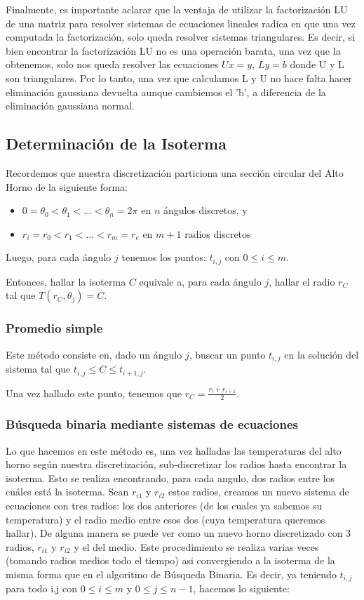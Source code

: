 Finalmente, es importante aclarar que la ventaja de utilizar la factorización LU de una matriz para resolver sistemas de ecuaciones lineales radica en que una vez computada la factorización, solo queda resolver sistemas triangulares. Es decir, si bien encontrar la factorización LU no es una operación barata, una vez que la obtenemos, solo nos queda resolver las ecuaciones $Ux = y$, $Ly = b$ donde U y L son triangulares. Por lo tanto, una vez que calculamos L y U no hace falta hacer eliminación gaussiana devuelta aunque cambiemos el 'b', a diferencia de la eliminación gaussiana normal.

\subsection{Determinación de la Isoterma}

Recordemos que nuestra discretización particiona una sección circular del Alto Horno de la siguiente forma:
 \begin{itemize}
 	\item $0 = \theta_0 < \theta_1 < ... < \theta_n = 2\pi$ en $n$ \'angulos discretos, y
 	\item $r_i = r_0 < r_1 < ... < r_m = r_e$ en $m+1$ radios discretos
 \end{itemize}

Luego, para cada ángulo $j$ tenemos los puntos: $t_{i,j}$ con $0 \leq i \leq m$.

Entonces, hallar la isoterma $C$ equivale a, para cada ángulo $j$, hallar el radio $r_C$ tal que $T(r_C, \theta_j) = C$.

\subsubsection{Promedio simple}

Este método consiste en, dado un ángulo $j$, buscar un punto $t_{i,j}$ en la solución del sistema tal que $t_{i,j} \leq C \leq t_{i+1,j}$.

Una vez hallado este punto, tenemos que $r_C = \frac{r_i + r_{i+1}}{2}$.

\subsubsection{Búsqueda binaria mediante sistemas de ecuaciones}

Lo que hacemos en este método es, una vez halladas las temperaturas del alto horno según nuestra discretización, sub-discretizar los radios hasta encontrar la isoterma. Esto se realiza encontrando, para cada angulo, dos radios entre los cuáles está la isoterma. Sean $r_{i1}$ y $r_{i2}$ estos radios, creamos un nuevo sistema de ecuaciones con tres radios: los dos anteriores (de los cuales ya sabemos su temperatura) y el radio medio entre esos dos (cuya temperatura queremos hallar). De alguna manera se puede ver como un nuevo horno discretizado con 3 radios, $r_{i1}$ y $r_{i2}$ y el del medio. Este procedimiento se realiza varias veces (tomando radios medios todo el tiempo) asi convergiendo a la isoterma de la misma forma que en el algoritmo de Búsqueda Binaria. Es decir, ya teniendo $t_{i,j}$ para todo i,j con $0 \leq i \leq m$ y $0 \leq j \leq n-1$, hacemos lo siguiente:

